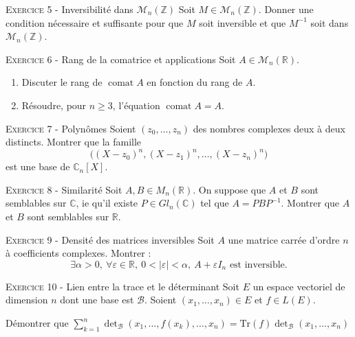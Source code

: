 \documentclass[11pt]{article}
\newcommand{\mtr}{\mathbb{R}}
\newcommand{\mcmnr}{\mathcal{M}_n(\mtr)}
\DeclareMathOperator{\comat}{comat}
\newcommand{\veps}{\varepsilon}
\begin{document}


\vskip0.3cm\noindent\textsc{Exercice 5} - Inversibilité dans $\mathcal M_n(\mathbb Z)$
\vskip0.2cm
Soit $M\in \mathcal M_n(\mathbb Z)$. Donner une condition nécessaire et suffisante pour
que $M$ soit inversible et que $M^{-1}$ soit dans $\mathcal M_n(\mathbb Z)$.




\vskip0.3cm\noindent\textsc{Exercice 6} - Rang de la comatrice et applications
\vskip0.2cm
Soit $A\in\mcmnr$.
\begin{enumerate}
\item Discuter le rang de $\comat A$ en fonction du rang de $A$.
\item Résoudre, pour $n\geq 3$, l'équation $\comat A=A$.
\end{enumerate}




\vskip0.3cm\noindent\textsc{Exercice 7} - Polynômes
\vskip0.2cm
Soient $(z_0,\dots,z_{n})$ des nombres complexes deux à deux distincts. Montrer que la famille
$$\big( (X-z_0)^n,(X-z_1)^n,\dots,(X-z_n)^n\big)$$
est une base de $\mathbb C_n[X]$.




\vskip0.3cm\noindent\textsc{Exercice 8} - Similarité
\vskip0.2cm
Soit $A,B\in M_n(\mathbb R)$. On suppose que $A$ et $B$ sont semblables sur $\mathbb C$,
ie qu'il existe $P\in Gl_n(\mathbb C)$ tel que $A=PBP^{-1}$. Montrer que $A$ et $B$ sont semblables
sur $\mathbb R$.




\vskip0.3cm\noindent\textsc{Exercice 9} - Densité des matrices inversibles
\vskip0.2cm
Soit $A$ une matrice carrée d'ordre $n$ à coefficients complexes. Montrer :
$$\exists \alpha>0,\ \forall\veps\in\mtr,\ 0<|\veps|<\alpha,\ A+\veps I_n \textrm{ est inversible.}$$




\vskip0.3cm\noindent\textsc{Exercice 10} - Lien entre la trace et le déterminant
\vskip0.2cm
Soit $E$ un espace vectoriel de dimension $n$ dont une base est $\mathcal{B}$. Soient $(x_{1},\ldots,x_{n})\in E$ et $f\in L(E)$. 

Démontrer que $\sum_{k=1}^{n}\det_{\mathcal{B}}(x_{1},\ldots,f(x_{k}),\ldots,x_{n})=\textrm{Tr}(f)\det_{\mathcal{B}}(x_{1},\text{…},x_{n})$




\vskip0.5cm

\end{document}
